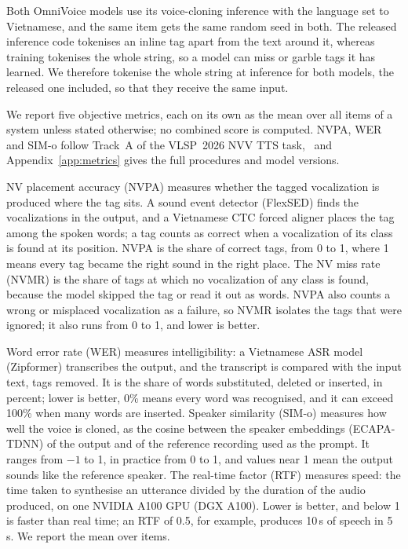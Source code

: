\documentclass{article} %
\begin{document}
Both OmniVoice models use its voice-cloning inference with the language set to Vietnamese, and
the same item gets the same random seed in both. The released inference code tokenises
an inline tag apart from the text around it, whereas training tokenises the whole string, so a
model can miss or garble tags it has learned. We therefore tokenise the whole string at
inference for both models, the released one included, so that they receive the same input.

We report five objective metrics, each on its own as the mean over all items of a system unless
stated otherwise; no combined score is computed. NVPA, WER and SIM-o follow Track~A of the
VLSP~2026 NVV TTS task,%
\ and Appendix~\ref{app:metrics} gives the full procedures and model versions.

NV placement accuracy (NVPA) measures whether the tagged vocalization is produced where the tag
sits. A sound event detector (FlexSED) finds the vocalizations in the output, and a Vietnamese
CTC forced aligner places the tag among the spoken words; a tag counts as correct when a
vocalization of its class is found at its position. NVPA is the share of correct tags, from 0 to
1, where 1 means every tag became the right sound in the right place. The NV miss rate (NVMR) is
the share of tags at which no vocalization of any class is found, because the model skipped the
tag or read it out as words. NVPA also counts a wrong or misplaced vocalization as a failure, so
NVMR isolates the tags that were ignored; it also runs from 0 to 1, and lower is better.

Word error rate (WER) measures intelligibility: a Vietnamese ASR model (Zipformer) transcribes
the output, and the transcript is compared with the input text, tags removed. It is the share of
words substituted, deleted or inserted, in percent; lower is better, 0\% means every word was
recognised, and it can exceed 100\% when many words are inserted. Speaker similarity (SIM-o)
measures how well the voice is cloned, as the cosine between the speaker embeddings (ECAPA-TDNN)
of the output and of the reference recording used as the prompt. It ranges from $-1$ to 1, in
practice from 0 to 1, and values near 1 mean the output sounds like the reference speaker. The
real-time factor (RTF) measures speed: the time taken to synthesise an utterance divided by the
duration of the audio produced, on one NVIDIA A100 GPU (DGX A100). Lower is better, and below 1
is faster than real time; an RTF of 0.5, for example, produces 10\,s of speech in 5\,s. We report
the mean over items.
\end{document}
